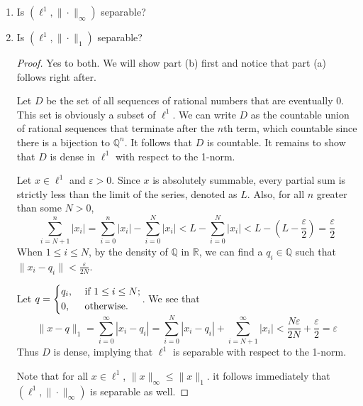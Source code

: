 \documentclass{article}
\theoremstyle{plain} %
\numberwithin{thm}{section} %
\theoremstyle{definition}
\begin{document}
    \begin{enumerate}[label=(\alph*)]
        \item Is $(\ell^1,\|\cdot\|_\infty)$ separable?
        \item Is $(\ell^1,\|\cdot\|_1)$ separable?
        \begin{proof}
            Yes to both. We will show part (b) first and notice that part (a) follows right after.

            Let \(D\) be the set of all sequences of rational numbers that are eventually 0. This set is obviously a subset of \(\ell ^1\). We can write \(D\) as the countable union of rational sequences that terminate after the \(n\)th term, which countable since there is a bijection to \(\mathbb{Q}^n\). It follows that \(D\) is countable. It remains to show that \(D\) is dense in \(\ell ^1\) with respect to the 1-norm.

            Let \(x \in \ell ^1\) and \(\varepsilon > 0\). Since \(x\) is absolutely summable, every partial sum is strictly less than the limit of the series, denoted as \(L\). Also, for all \(n\) greater than some \(N > 0\),
            \[
                \sum_{i=N+1} ^{n} |x_i| = \sum_{i=0} ^{n} |x_i| - \sum_{i=0} ^{N} |x_i| < L - \sum_{i=0} ^{N} |x_i| < L - \left(L - \frac{\varepsilon}{2}\right) = \frac{\varepsilon}{2}
            \]
            When \(1\leq i\leq N\), by the density of \(\mathbb{Q}\) in \(\mathbb{R}\), we can find a \(q_i \in \mathbb{Q}\) such that \(\|x_i - q_i\| < \frac{\varepsilon}{2N}\).
            
            Let \(q = \begin{dcases}
                q_i, &\text{ if } 1\leq i\leq N ;\\
                0, &\text{ otherwise} .
            \end{dcases}\). 
            We see that
            \[
                \|x-q\| _1 = \sum_{i=0} ^{\infty} |x_i - q_i| = \sum_{i=0} ^N |x_i - q_i| + \sum_{i=N+1}^{\infty} |x_i| < \frac{N\varepsilon}{2N} + \frac{\varepsilon}{2} = \varepsilon
            \]
            Thus \(D\) is dense, implying that \(\ell ^1\) is separable with respect to the 1-norm.

            Note that for all \(x \in \ell ^1\), \(\|x\| _\infty \leq \|x\| _1\). it follows immediately that \((\ell ^1, \|\cdot\| _\infty)\) is separable as well.

        \end{proof}
    \end{enumerate}
\end{document}
